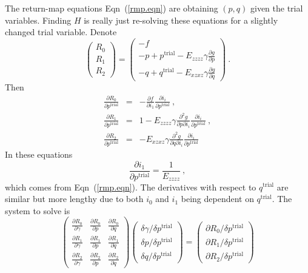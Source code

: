 \documentclass[]{scrreprt}
\begin{document}
The return-map equations Eqn~(\ref{rmp.eqn}) are obtaining $(p, q)$
given the trial variables.  Finding $H$ is really just re-solving
these equations for a slightly changed trial variable.  Denote
\begin{equation}
\left( \begin{array}{l} R_{0} \\ R_{1} \\ R_{2} \end{array} \right)
=
\left( \begin{array}{l} -f \\ -p + p^{\mathrm{trial}} - E_{zzzz}\gamma \frac{\partial g}{\partial
  p} \\ -q + q^{\mathrm{trial}} - E_{xzxz}\gamma \frac{\partial g}{\partial
  q} \end{array} \right) \ .
\end{equation}
Then
\begin{eqnarray}
\frac{\partial R_{0}}{\partial p^{\mathrm{trial}}} & = & -\frac{\partial
  f}{\partial i_{1}} \frac{\partial i_{i}}{\partial
  p^{\mathrm{trial}}}  \ , \\
\frac{\partial R_{1}}{\partial p^{\mathrm{trial}}} & = & 1 -
E_{zzzz}\gamma \frac{\partial^{2}g}{\partial p\partial i_{i}}\frac{\partial i_{i}}{\partial
  p^{\mathrm{trial}}}
\ , \\
\frac{\partial R_{2}}{\partial p^{\mathrm{trial}}} & = &
-E_{xzxz}\gamma \frac{\partial^{2}g}{\partial q\partial i_{i}}\frac{\partial i_{i}}{\partial
  p^{\mathrm{trial}}}
\end{eqnarray}
In these equations
\begin{equation}
\frac{\partial i_{1}}{\partial p^{\mathrm{trial}}} =
\frac{1}{E_{zzzz}} \ ,
\end{equation}
which comes from Eqn~(\ref{rmp.eqn}).  The derivatives with respect to
$q^{\mathrm{trial}}$ are similar but more lengthy due to both $i_{0}$
and $i_{1}$ being dependent on $q^{\mathrm{trial}}$.  The system to
solve is
\begin{equation}
\left( \begin{array}{ccc}
\frac{\partial R_{0}}{\partial \gamma} & \frac{\partial R_{0}}{\partial p} & \frac{\partial R_{0}}{\partial q} \\
\frac{\partial R_{1}}{\partial \gamma} & \frac{\partial R_{1}}{\partial p} & \frac{\partial R_{1}}{\partial q} \\
\frac{\partial R_{2}}{\partial \gamma} & \frac{\partial
  R_{2}}{\partial p} & \frac{\partial R_{2}}{\partial q}
\end{array} \right)
\left( \begin{array}{c}
\delta \gamma/\delta p^{\mathrm{trial}} \\
\delta p/\delta p^{\mathrm{trial}} \\
\delta q/\delta p^{\mathrm{trial}}
\end{array} \right) =
\left( \begin{array}{c}
\partial R_{0}/\delta p^{\mathrm{trial}} \\
\partial R_{1}/\delta p^{\mathrm{trial}} \\
\partial R_{2}/\delta p^{\mathrm{trial}}
\end{array} \right)
\end{equation}
\end{document}
